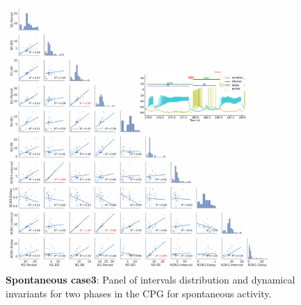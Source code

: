 \begin{figure}[htbp]
\centering
\includegraphics[width=0.9\textwidth]{./invariants/data/SUSSEX/prep3/images/2phases/panel_with_pairplot.pdf}
\caption{\textbf{Spontaneous case3}: Panel of intervals distribution and dynamical invariants for two phases in the CPG for spontaneous activity.}
\label{fig:prep3 2phases invariants pairplot}
\end{figure}

